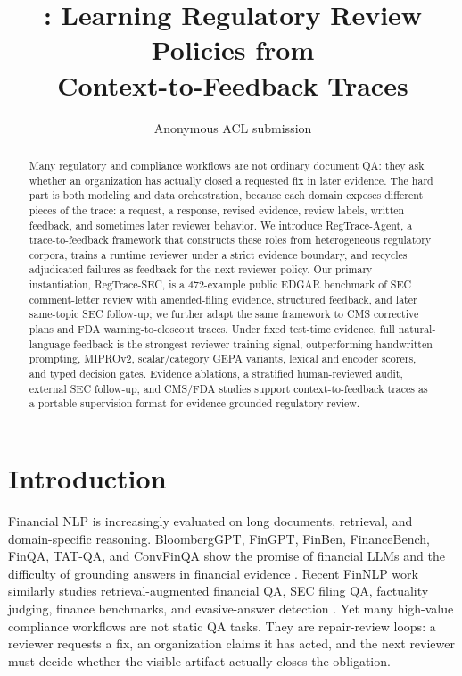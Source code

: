 \documentclass[11pt]{article}
\title{\framework{}: Learning Regulatory Review Policies from\\
Context-to-Feedback Traces}
\author{Anonymous ACL submission}
\newcommand{\dataset}{RegTrace-SEC}
\newcommand{\framework}{RegTrace-Agent}
\begin{document}
\maketitle
\begin{abstract}
Many regulatory and compliance workflows are not ordinary document QA: they ask whether an organization has actually closed a requested fix in later evidence. The hard part is both modeling and data orchestration, because each domain exposes different pieces of the trace: a request, a response, revised evidence, review labels, written feedback, and sometimes later reviewer behavior. We introduce \framework{}, a trace-to-feedback framework that constructs these roles from heterogeneous regulatory corpora, trains a runtime reviewer under a strict evidence boundary, and recycles adjudicated failures as feedback for the next reviewer policy. Our primary instantiation, \dataset{}, is a 472-example public EDGAR benchmark of SEC comment-letter review with amended-filing evidence, structured feedback, and later same-topic SEC follow-up; we further adapt the same framework to CMS corrective plans and FDA warning-to-closeout traces. Under fixed test-time evidence, full natural-language feedback is the strongest reviewer-training signal, outperforming handwritten prompting, MIPROv2, scalar/category GEPA variants, lexical and encoder scorers, and typed decision gates. Evidence ablations, a stratified human-reviewed audit, external SEC follow-up, and CMS/FDA studies support context-to-feedback traces as a portable supervision format for evidence-grounded regulatory review.
\end{abstract}

\section{Introduction}

Financial NLP is increasingly evaluated on long documents, retrieval, and domain-specific reasoning. BloombergGPT, FinGPT, FinBen, FinanceBench, FinQA, TAT-QA, and ConvFinQA show the promise of financial LLMs and the difficulty of grounding answers in financial evidence \citep{wu2023bloomberggpt,yang2023fingpt,xie2024finben,islam2023financebench,chen2021finqa,zhu2021tatqa,chen2022convfinqa}. Recent FinNLP work similarly studies retrieval-augmented financial QA, SEC filing QA, factuality judging, finance benchmarks, and evasive-answer detection \citep{lithgow2025rag,lai2025secqa,klimaszewski2025avenibench,wu2025nli,nuaimi2025evasive}. Yet many high-value compliance workflows are not static QA tasks. They are repair-review loops: a reviewer requests a fix, an organization claims it has acted, and the next reviewer must decide whether the visible artifact actually closes the obligation.
\end{document}
